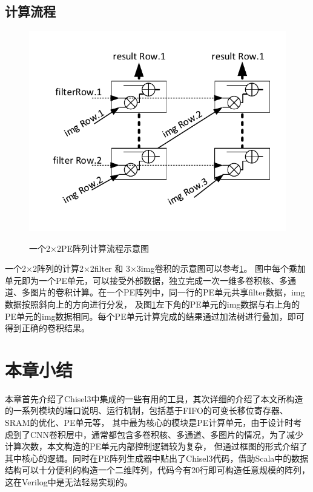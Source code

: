     \subsection{计算流程}
\begin{figure}[h]
    \centering
    \includegraphics{../pdf/pearray_k.pdf}\\
    \caption{一个2×2PE阵列计算流程示意图}
    \label{pearray_k}
\end{figure}
一个2×2阵列的计算2×2filter 和 3×3img卷积的示意图可以参考\ref{pearray_k}。
图中每个乘加单元即为一个PE单元，可以接受外部数据，独立完成一次一维多卷积核、多通道、多图片的卷积计算。在一个PE阵列中，同一行的PE单元共享filter数据，img数据按照斜向上的方向进行分发，
及图\ref{pearray_k}左下角的PE单元的img数据与右上角的PE单元的img数据相同。每个PE单元计算完成的结果通过加法树进行叠加，即可得到正确的卷积结果。

\section{本章小结}
本章首先介绍了Chisel3中集成的一些有用的工具，其次详细的介绍了本文所构造的一系列模块的端口说明、运行机制，包括基于FIFO的可变长移位寄存器、SRAM的优化、PE单元等，
其中最为核心的模块是PE计算单元，由于设计时考虑到了CNN卷积层中，通常都包含多卷积核、多通道、多图片的情况，为了减少计算次数，本文构造的PE单元内部控制逻辑较为复杂，
但通过框图的形式介绍了其中核心的逻辑。同时在PE阵列生成器中贴出了Chisel3代码，借助Scala中的数据结构可以十分便利的构造一个二维阵列，代码今有20行即可构造任意规模的阵列，
这在Verilog中是无法轻易实现的。

